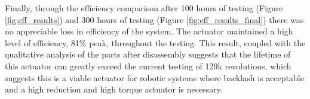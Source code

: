 Finally, through the efficiency comparison after 100 hours of testing (Figure \ref{fig:eff_results}) and 300 hours of testing (Figure \ref{fig:eff_results_final}) there was no appreciable loss in efficiency of the system. The actuator maintained a high level of efficiency, 81\% peak, throughout the testing. This result, coupled with the qualitative analysis of the parts after disassembly suggests that the lifetime of this actuator can greatly exceed the current testing of 129k revolutions, which suggests this is a viable actuator for robotic systems where backlash is acceptable and a high reduction and high torque actuator is necessary. 


